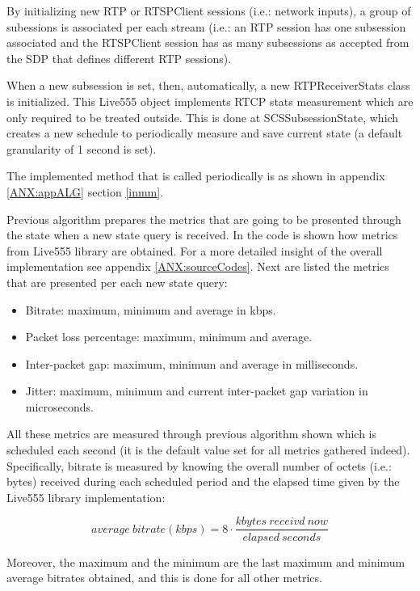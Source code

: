 By initializing new RTP or RTSPClient sessions (i.e.: network inputs), a group of subessions is associated per each stream (i.e.: an RTP session has one subsession associated and the RTSPClient session has as many subsessions as accepted from the SDP that defines different RTP sessions).

When a new subsession is set, then, automatically, a new RTPReceiverStats class is initialized. This Live555 object implements RTCP stats measurement which are only required to be treated outside. This is done at SCSSubsessionState, which creates a new schedule to periodically measure and save current state (a default granularity of 1 second is set).

The implemented method that is called periodically is as shown in appendix \ref{ANX:appALG} section \ref{inmm}.

Previous algorithm prepares the metrics that are going to be presented through the state when a new state query is received. In the code is shown how metrics from Live555 library are obtained. For a more detailed insight of the overall implementation see appendix \ref{ANX:sourceCodes}. Next are listed the metrics that are presented per each new state query:

\begin{itemize}
\item Bitrate: maximum, minimum and average in kbps.
\item Packet loss percentage: maximum, minimum and average.
\item Inter-packet gap: maximum, minimum and average in milliseconds.
\item Jitter: maximum, minimum and current inter-packet gap variation in microseconds.
\end{itemize}

All these metrics are measured through previous algorithm shown which is scheduled each second (it is the default value set for all metrics gathered indeed). Specifically, bitrate is measured by knowing the overall number of octets (i.e.: bytes) received during each scheduled period and the elapsed time given by the Live555 library implementation:

\begin{equation}\label{E:bitrate}
average\ bitrate (kbps) = 8 \cdot \frac{kbytes\ receivd\ now}{elapsed\ seconds}
\end{equation}

Moreover, the maximum and the minimum are the last maximum and minimum average bitrates obtained, and this is done for all other metrics.

